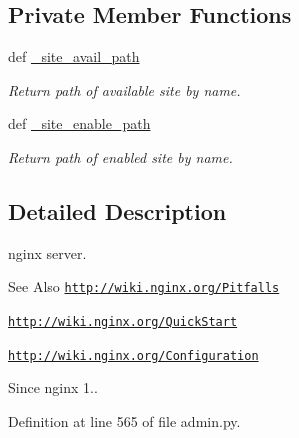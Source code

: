 \subsection*{Private Member Functions}
\begin{DoxyCompactItemize}
\item 
def \hyperlink{classadmin_1_1www_1_1nginx_aca978777776a324a0c3ac506100da002}{\-\_\-site\-\_\-avail\-\_\-path}
\begin{DoxyCompactList}\small\item\em Return path of available site by name. \end{DoxyCompactList}\item 
def \hyperlink{classadmin_1_1www_1_1nginx_af4bc4f7da3d2c56ba8e4b61b16052394}{\-\_\-site\-\_\-enable\-\_\-path}
\begin{DoxyCompactList}\small\item\em Return path of enabled site by name. \end{DoxyCompactList}\end{DoxyCompactItemize}


\subsection{Detailed Description}
nginx server. 

\begin{DoxySeeAlso}{See Also}
\href{http://wiki.nginx.org/Pitfalls}{\tt http\-://wiki.\-nginx.\-org/\-Pitfalls} 

\href{http://wiki.nginx.org/QuickStart}{\tt http\-://wiki.\-nginx.\-org/\-Quick\-Start} 

\href{http://wiki.nginx.org/Configuration}{\tt http\-://wiki.\-nginx.\-org/\-Configuration} 
\end{DoxySeeAlso}
\begin{DoxySince}{Since}
nginx 1.. 
\end{DoxySince}


Definition at line 565 of file admin.\-py.



